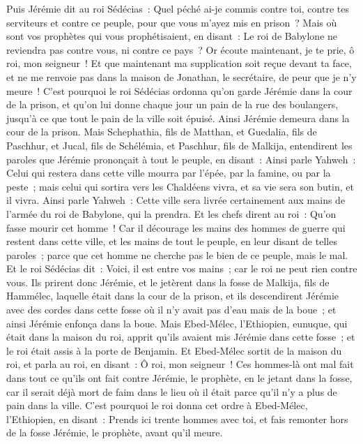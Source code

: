 \begin{multicols}{2}
Puis Jérémie dit au roi Sédécias~: Quel péché ai-je commis contre toi, contre tes serviteurs et contre ce peuple, pour que vous m'ayez mis en prison~?
Mais où sont vos prophètes qui vous prophétisaient, en disant~: Le roi de Babylone ne reviendra pas contre vous, ni contre ce pays~?
Or écoute maintenant, je te prie, ô roi, mon seigneur~! Et que maintenant ma supplication soit reçue devant ta face, et ne me renvoie pas dans la maison de Jonathan, le secrétaire, de peur que je n'y meure~!
C'est pourquoi le roi Sédécias ordonna qu'on garde Jérémie dans la cour de la prison, et qu'on lui donne chaque jour un pain de la rue des boulangers, jusqu'à ce que tout le pain de la ville soit épuisé. Ainsi Jérémie demeura dans la cour de la prison.
\VerseOne{}Mais Schephathia, fils de Matthan, et Guedalia, fils de Paschhur, et Jucal, fils de Schélémia, et Paschhur, fils de Malkija, entendirent les paroles que Jérémie prononçait à tout le peuple, en disant~:
Ainsi parle Yahweh~: Celui qui restera dans cette ville mourra par l'épée, par la famine, ou par la peste~; mais celui qui sortira vers les Chaldéens vivra, et sa vie sera son butin, et il vivra.
Ainsi parle Yahweh~: Cette ville sera livrée certainement aux mains de l'armée du roi de Babylone, qui la prendra.
Et les chefs dirent au roi~: Qu'on fasse mourir cet homme~! Car il décourage les mains des hommes de guerre qui restent dans cette ville, et les mains de tout le peuple, en leur disant de telles paroles~; parce que cet homme ne cherche pas le bien de ce peuple, mais le mal.
Et le roi Sédécias dit~: Voici, il est entre vos mains~; car le roi ne peut rien contre vous.
Ils prirent donc Jérémie, et le jetèrent dans la fosse de Malkija, fils de Hammélec, laquelle était dans la cour de la prison, et ils descendirent Jérémie avec des cordes dans cette fosse où il n'y avait pas d'eau mais de la boue~; et ainsi Jérémie enfonça dans la boue.
Mais Ebed-Mélec, l'Ethiopien, eunuque, qui était dans la maison du roi, apprit qu'ils avaient mis Jérémie dans cette fosse~; et le roi était assis à la porte de Benjamin.
Et Ebed-Mélec sortit de la maison du roi, et parla au roi, en disant~:
Ô roi, mon seigneur~! Ces hommes-là ont mal fait dans tout ce qu'ils ont fait contre Jérémie, le prophète, en le jetant dans la fosse, car il serait déjà mort de faim dans le lieu où il était parce qu'il n'y a plus de pain dans la ville.
C'est pourquoi le roi donna cet ordre à Ebed-Mélec, l'Ethiopien, en disant~: Prends ici trente hommes avec toi, et fais remonter hors de la fosse Jérémie, le prophète, avant qu'il meure.

\end{multicols}

